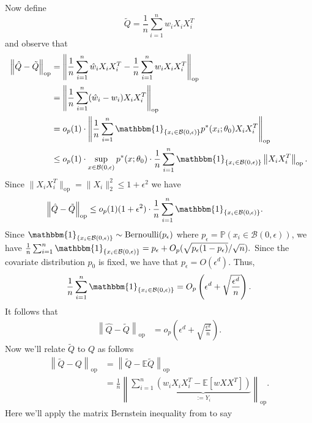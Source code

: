 \documentclass[11pt]{article}
\begin{document}
Now define 
\[\tilde{Q} = \frac{1}{n}\sum_{i = 1}^n w_iX_iX_i^T\]
and observe that 
\begin{align}
\left\|\hat{Q} - \tilde{Q}\right\|_{\text{op}} &= \left\|\frac{1}{n}\sum_{i = 1}^n\hat{w}_iX_iX_i^T - \frac{1}{n}\sum_{i = 1}^nw_iX_iX_i^T\right\|_{\text{op}} \\
&= \left\|\frac{1}{n}\sum_{i = 1}^n(\hat{w}_i - w_i)X_iX_i^T\right\|_{\text{op}} \\
&= o_p(1) \cdot \left\|\frac{1}{n}\sum_{i = 1}^n\mathbbm{1}_{\{x_i \in \mathcal{B}(0, \epsilon)\}}p^*(x_i;\theta_0)X_iX_i^T\right\|_{\text{op}} \\
&\leq o_p(1) \cdot \sup_{x \in \mathcal{B}(0, \epsilon)}p^*(x;\theta_0) \cdot \frac{1}{n}\sum_{i = 1}^n\mathbbm{1}_{\{x_i \in \mathcal{B}(0, \epsilon)\}}\left\|X_iX_i^T\right\|_{\text{op}}.
\end{align}
Since $\|X_iX_i^T\|_{\text{op}} = \|X_i\|_2^2 \leq 1 + \epsilon^2$ we have
\begin{align*}
\left\|\hat{Q} - \tilde{Q}\right\|_{\text{op}} &\leq o_p(1)(1 + \epsilon^2) \cdot \frac{1}{n}\sum_{i = 1}^n\mathbbm{1}_{\{x_i \in \mathcal{B}(0, \epsilon)\}}.
\end{align*}
Since $\mathbbm{1}_{\{x_i \in \mathcal{B}(0, \epsilon)\}} \sim \text{Bernoulli}(p_{\epsilon})$ where $p_\epsilon = \mathbb{P}(x_i \in \mathcal{B}(0, \epsilon))$, we have $\frac{1}{n}\sum_{i = 1}^n\mathbbm{1}_{\{x_i \in \mathcal{B}(0, \epsilon)\}} = p_\epsilon + O_p(\sqrt{p_{\epsilon}(1-p_{\epsilon})}/\sqrt{n}).$ Since the covariate distribution $p_0$ is fixed, we have that $p_{\epsilon} = O(\epsilon^d)$. Thus,
\[\frac{1}{n}\sum_{i = 1}^n\mathbbm{1}_{\{x_i \in \mathcal{B}(0, \epsilon)\}} = O_p\left(\epsilon^d + \sqrt{\frac{\epsilon^d}{n}}\right).\]
It follows that
\begin{align*}
\left\|\hat{Q} - \tilde{Q}\right\|_{\text{op}} &= o_p\left(\epsilon^d + \sqrt{\frac{\epsilon^d}{n}}\right).
\end{align*}
Now we'll relate $\tilde Q$ to $Q$ as follows
\begin{align*}
    \left\|\tilde{Q} - Q\right\|_{\text{op}} &= \left\|\tilde{Q} - \mathbb{E}\tilde{Q}\right\|_{\text{op}} \\
    &= \frac{1}{n}\left\|\sum_{i = 1}^n\underbrace{\left(w_iX_iX_i^T - \mathbb{E}[wXX^T]\right)}_{:= Y_i}\right\|_{\text{op}}.
\end{align*}
Here we'll apply the matrix Bernstein inequality from  to say 
\end{document}

